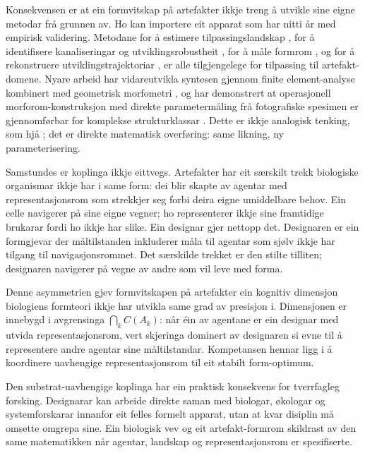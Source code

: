 \documentclass[11pt,a4paper]{article}
\begin{document}
Konsekvensen er at ein formvitskap på artefakter ikkje treng å utvikle sine eigne metodar frå grunnen av. Ho kan importere eit apparat som har nitti år med empirisk validering. Metodane for å estimere tilpassingslandskap \citep{wright1932, lande1979, arnold2001}, for å identifisere kanaliseringar og utviklingsrobustheit \citep{waddington1957, wagner2005}, for å måle formrom \citep{raup1966, mitteroecker2009, mcghee2007}, og for å rekonstruere utviklingstrajektoriar \citep{gould1977, arthur2004}, er alle tilgjengelege for tilpassing til artefakt-domene. Nyare arbeid har vidareutvikla syntesen gjennom finite element-analyse kombinert med geometrisk morfometri \citep{polly2016}, og har demonstrert at operasjonell morforom-konstruksjon med direkte parametermåling frå fotografiske spesimen er gjennomførbar for komplekse strukturklassar \citep{contrerasfigueroa2023}. Dette er ikkje analogisk tenking, som hjå \citet{steadman1979}; det er direkte matematisk overføring: same likning, ny parameterisering.

Samstundes er koplinga ikkje eittvegs. Artefakter har eit særskilt trekk biologiske organismar ikkje har i same form: dei blir skapte av agentar med representasjonsrom som strekkjer seg forbi deira eigne umiddelbare behov. Ein celle navigerer på sine eigne vegner; ho representerer ikkje sine framtidige brukarar fordi ho ikkje har slike. Ein designar gjer nettopp det. Designaren er ein formgjevar der måltilstanden inkluderer måla til agentar som sjølv ikkje har tilgang til navigasjonsrommet. Det særskilde trekket er den stilte tilliten; designaren navigerer på vegne av andre som vil leve med forma.

Denne asymmetrien gjev formvitskapen på artefakter ein kognitiv dimensjon biologiens formteori ikkje har utvikla same grad av presisjon i. Dimensjonen er innebygd i avgrensinga $\bigcap_k C(A_k)$: når éin av agentane er ein designar med utvida representasjonsrom, vert skjeringa dominert av designaren si evne til å representere andre agentar sine måltilstandar. Kompetansen hennar ligg i å koordinere uavhengige representasjonsrom til eit stabilt form-optimum.

Den substrat-uavhengige koplinga har ein praktisk konsekvens for tverrfagleg forsking. Designarar kan arbeide direkte saman med biologar, økologar og systemforskarar innanfor eit felles formelt apparat, utan at kvar disiplin må omsette omgrepa sine. Ein biologisk vev og eit artefakt-formrom skildrast av den same matematikken når agentar, landskap og representasjonsrom er spesifiserte.
\end{document}
